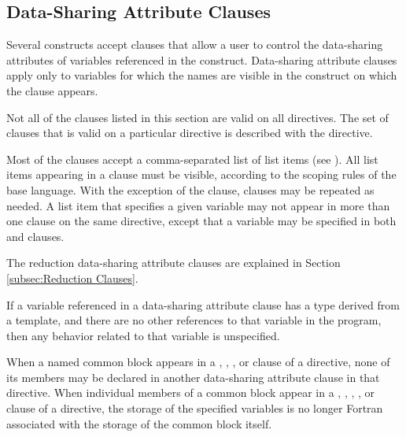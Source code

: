 \subsection{Data-Sharing Attribute Clauses}
\label{subsec:Data-Sharing Attribute Clauses}
Several constructs accept clauses that allow a user to control the data-sharing attributes
of variables referenced in the construct. Data-sharing attribute clauses apply only to
variables for which the names are visible in the construct on which the clause appears.

Not all of the clauses listed in this section are valid on all directives. The set of clauses
that is valid on a particular directive is described with the directive.

Most of the clauses accept a comma-separated list of list items (see
).
All list items appearing in a clause must be visible, according to the scoping rules
of the base language. With the exception of the  clause, clauses may be
repeated as needed. A list item that specifies a given variable may not appear in more
than one clause on the same directive, except that a variable may be specified in both
 and  clauses.

The reduction data-sharing attribute clauses are explained in Section \ref{subsec:Reduction Clauses}.

\begin{cppspecific}
If a variable referenced in a data-sharing attribute clause has a type derived from a
template, and there are no other references to that variable in the program, then any
behavior related to that variable is unspecified.
\end{cppspecific}
%
\begin{fortranspecific}
When a named common block appears in a , ,
, or  clause of a directive, none of its members may be declared
in another data-sharing attribute clause in that directive. When individual members of a common block appear in a , ,
, , or  clause of a directive, the storage of the specified variables is no longer Fortran associated with the storage of the common block itself.
\end{fortranspecific}










